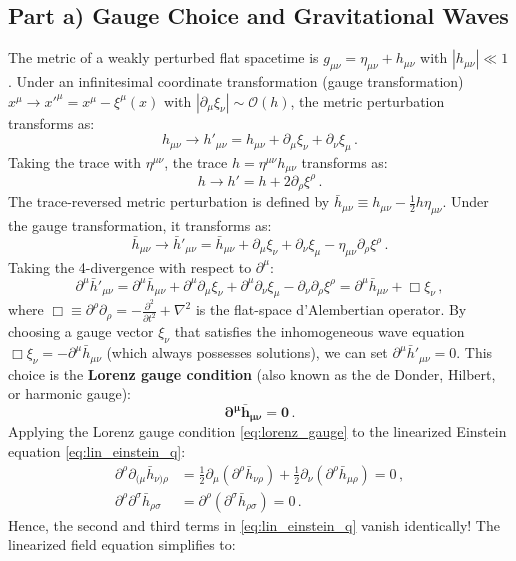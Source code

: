 \documentclass[12pt]{article}
\newcommand{\be}{\begin{equation}}
\newcommand{\ee}{\end{equation}}
\begin{document}
\subsection*{Part a) Gauge Choice and Gravitational Waves}

The metric of a weakly perturbed flat spacetime is $g_{\mu\nu} = \eta_{\mu\nu} + h_{\mu\nu}$ with $|h_{\mu\nu}| \ll 1$.
Under an infinitesimal coordinate transformation (gauge transformation) $x^\mu \to x'^\mu = x^\mu - \xi^\mu(x)$ with $|\partial_\mu \xi_\nu| \sim \mathcal{O}(h)$, the metric perturbation transforms as:
\be
h_{\mu\nu} \to h'_{\mu\nu} = h_{\mu\nu} + \partial_\mu \xi_\nu + \partial_\nu \xi_\mu \,.
\ee
Taking the trace with $\eta^{\mu\nu}$, the trace $h = \eta^{\mu\nu} h_{\mu\nu}$ transforms as:
\be
h \to h' = h + 2 \partial_\rho \xi^\rho \,.
\ee
The trace-reversed metric perturbation is defined by $\bar h_{\mu\nu} \equiv h_{\mu\nu} - \frac{1}{2} h \eta_{\mu\nu}$. Under the gauge transformation, it transforms as:
\be
\bar h_{\mu\nu} \to \bar h'_{\mu\nu} = \bar h_{\mu\nu} + \partial_\mu \xi_\nu + \partial_\nu \xi_\mu - \eta_{\mu\nu} \partial_\rho \xi^\rho \,.
\ee
Taking the 4-divergence with respect to $\partial^\mu$:
\be
\partial^\mu \bar h'_{\mu\nu} = \partial^\mu \bar h_{\mu\nu} + \partial^\mu \partial_\mu \xi_\nu + \partial^\mu \partial_\nu \xi_\mu - \partial_\nu \partial_\rho \xi^\rho = \partial^\mu \bar h_{\mu\nu} + \Box \xi_\nu \,,
\ee
where $\Box \equiv \partial^\rho \partial_\rho = -\frac{\partial^2}{\partial t^2} + \nabla^2$ is the flat-space d'Alembertian operator.
By choosing a gauge vector $\xi_\nu$ that satisfies the inhomogeneous wave equation $\Box \xi_\nu = - \partial^\mu \bar h_{\mu\nu}$ (which always possesses solutions), we can set $\partial^\mu \bar h'_{\mu\nu} = 0$.
This choice is the \textbf{Lorenz gauge condition} (also known as the de Donder, Hilbert, or harmonic gauge):
\be
\mathbf{\partial^\mu \bar h_{\mu\nu} = 0} \,.
\label{eq:lorenz_gauge}
\ee
Applying the Lorenz gauge condition \eqref{eq:lorenz_gauge} to the linearized Einstein equation \eqref{eq:lin_einstein_q}:
\begin{align}
\partial^\rho \partial_{(\mu} \bar h_{\nu)\rho} &= \frac{1}{2} \partial_\mu \left( \partial^\rho \bar h_{\nu\rho} \right) + \frac{1}{2} \partial_\nu \left( \partial^\rho \bar h_{\mu\rho} \right) = 0 \,, \\
\partial^\rho \partial^\sigma \bar h_{\rho\sigma} &= \partial^\rho \left( \partial^\sigma \bar h_{\rho\sigma} \right) = 0 \,.
\end{align}
Hence, the second and third terms in \eqref{eq:lin_einstein_q} vanish identically! The linearized field equation simplifies to:
\end{document}
